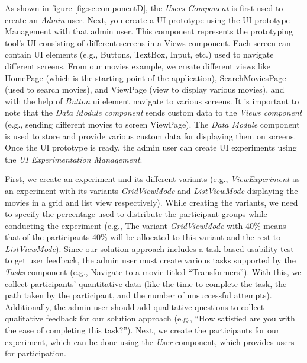 As shown in figure \ref{fig:sc:componentD}, the \textit{Users Component} is first used to create an \textit{Admin} user. 
Next, you create a UI prototype using the UI prototype Management with that admin user. 
This component represents the prototyping tool's UI consisting of different screens in a Views component. 
Each screen can contain UI elements (e.g., Buttons, TextBox, Input, etc.) used to navigate different screens.
From our movies example, we create different views like HomePage (which is the starting point of the application), SearchMoviesPage (used to search movies), and ViewPage (view to display various movies), and with the help of \textit{Button} \ac{ui} element navigate to various screens.
It is important to note that the \textit{Data Module component} sends custom data to the \textit{Views component} (e.g., sending different movies to screen ViewPage).
The \textit{Data Module} component is used to store and provide various custom data for displaying them on screens.
Once the UI prototype is ready, the admin user can create UI experiments using the \textit{UI Experimentation Management}.

First, we create an experiment and its different variants (e.g., \textit{ViewExperiment} as an experiment with its variants \textit{GridViewMode} and \textit{ListViewMode} displaying the movies in a grid and list view respectively). 
While creating the variants, we need to specify the percentage used to distribute the participant groups while conducting the experiment (e.g., The variant \textit{GridViewMode} with 40\% means that of the participants 40\% will be allocated to this variant and the rest to \textit{ListViewMode}).
Since our solution approach includes a task-based usability test to get user feedback, the admin user must create various tasks supported by the \textit{Tasks} component (e.g., Navigate to a movie titled ``Transformers'').
With this, we collect participants' quantitative data (like the time to complete the task, the path taken by the participant, and the number of unsuccessful attempts). 
Additionally, the admin user should add qualitative questions to collect qualitative feedback for our solution approach (e.g., ``How satisfied are you with the ease of completing this task?'').
Next, we create the participants for our experiment, which can be done using the \textit{User} component, which provides users for participation.

